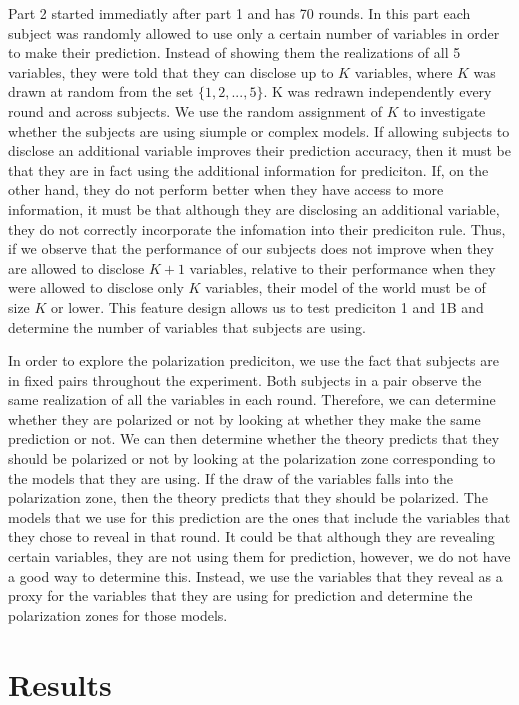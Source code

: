 \documentclass[
  12pt,
]{article}
\begin{document}
Part 2 started immediatly after part 1 and has 70 rounds. In this part
each subject was randomly allowed to use only a certain number of
variables in order to make their prediction. Instead of showing them the
realizations of all 5 variables, they were told that they can disclose
up to \(K\) variables, where \(K\) was drawn at random from the set
\(\{1, 2, ..., 5\}\). K was redrawn independently every round and across
subjects. We use the random assignment of \(K\) to investigate whether
the subjects are using siumple or complex models. If allowing subjects
to disclose an additional variable improves their prediction accuracy,
then it must be that they are in fact using the additional information
for prediciton. If, on the other hand, they do not perform better when
they have access to more information, it must be that although they are
disclosing an additional variable, they do not correctly incorporate the
infomation into their prediciton rule. Thus, if we observe that the
performance of our subjects does not improve when they are allowed to
disclose \(K+1\) variables, relative to their performance when they were
allowed to disclose only \(K\) variables, their model of the world must
be of size \(K\) or lower. This feature design allows us to test
prediciton 1 and 1B and determine the number of variables that subjects
are using.

In order to explore the polarization prediciton, we use the fact that
subjects are in fixed pairs throughout the experiment. Both subjects in
a pair observe the same realization of all the variables in each round.
Therefore, we can determine whether they are polarized or not by looking
at whether they make the same prediction or not. We can then determine
whether the theory predicts that they should be polarized or not by
looking at the polarization zone corresponding to the models that they
are using. If the draw of the variables falls into the polarization
zone, then the theory predicts that they should be polarized. The models
that we use for this prediction are the ones that include the variables
that they chose to reveal in that round. It could be that although they
are revealing certain variables, they are not using them for prediction,
however, we do not have a good way to determine this. Instead, we use
the variables that they reveal as a proxy for the variables that they
are using for prediction and determine the polarization zones for those
models.

\hypertarget{results}{%
\section{Results}\label{results}}
\end{document}
